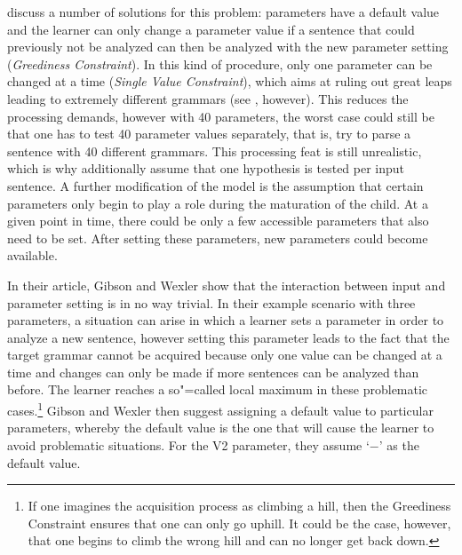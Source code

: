\citet{GW94a} discuss a number of solutions for this problem: parameters have a default value
and the learner can only change a parameter value if a sentence that could previously not be analyzed
can then be analyzed with the new parameter setting (\emph{Greediness Constraint}).
In this kind of procedure, only one parameter can be changed at a time
(\emph{Single Value Constraint}),
which aims at ruling out great leaps leading to extremely different grammars (see \citealp[--613]{BN96a}, however).
This reduces the processing demands, however with 40 parameters, the worst case could still be that
one has to test 40 parameter values separately, that is, try to parse a sentence with 40 different
grammars. This processing feat is still unrealistic, which is why \citet[]{GW94a} additionally
assume that one hypothesis is tested per input sentence.
A further modification of the model is the assumption that certain parameters only begin to play a role
during the maturation of the child. At a given point in time, there could be only a few accessible parameters
that also need to be set. After setting these parameters, new parameters could become available.

In their article, Gibson and Wexler show that the interaction between input and parameter setting is in no way trivial.
In their example scenario with three parameters, a situation can arise in which a learner sets a parameter in order to analyze
a new sentence, however setting this parameter leads to the fact that the target grammar cannot be acquired because only one value can
be changed at a time and changes can only be made if more sentences can be analyzed than before. The learner reaches a so"=called
local maximum in these problematic cases.\footnote{%
	If one imagines the acquisition process as climbing a hill, then the Greediness Constraint ensures
	that one can only go uphill. It could be the case, however, that one begins to climb the wrong hill and can no longer get back down.}
Gibson and Wexler then suggest assigning a default value to particular parameters, whereby the default value is the one that will cause the learner
to avoid problematic situations. For the V2 parameter, they assume `$-$' as the default value.


